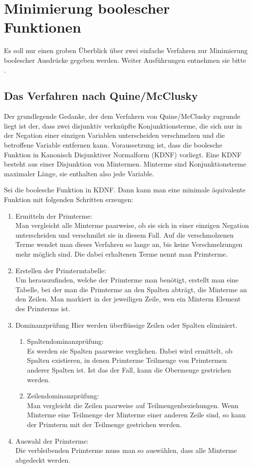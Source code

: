 \documentclass[draft]{scrreprt}
\begin{document}
{	\chapter{Minimierung boolescher Funktionen} \label{Minimierung}
	Es soll nur einen groben Überblick über zwei einfache Verfahren zur Minimierung boolescher Ausdrücke gegeben werden. Weiter Ausführungen entnehmen sie bitte \cite{G01}.
	\section{Das Verfahren nach Quine/McClusky} \label{Min_QMC} 
	Der grundlegende Gedanke, der dem Verfahren von Quine/McClusky zugrunde liegt ist der, dass zwei disjunktiv verknüpfte  Konjunktionsterme, die sich nur in der Negation einer einzigen Variablen unterscheiden verschmelzen und die betroffene Variable entfernen kann. Voraussetzung ist, dass die boolesche Funktion in Kanonisch Disjunktiver Normalform (KDNF) vorliegt. Eine KDNF besteht aus einer Disjunktion von Mintermen. Minterme sind Konjunktionsterme maximaler Länge, sie enthalten also jede Variable.
	
	Sei die boolesche Funktion in KDNF. Dann kann man eine minimale äquivalente Funktion mit folgenden Schritten erzeugen:
	\begin{enumerate}
		\item Ermitteln der Primterme:\\
		Man vergleicht alle Minterme paarweise, ob sie sich in einer einzigen Negation unterscheiden und verschmilzt sie in diesem Fall. Auf die verschmolzenen Terme wendet man dieses Verfahren so lange an, bis keine Verschmelzungen mehr möglich sind. Die dabei erhaltenen Terme nennt man Primterme.
		\item Erstellen der Primtermtabelle:\\
		Um herauszufinden, welche der Primterme man benötigt, erstellt man eine Tabelle, bei der man die Primterme an den Spalten abträgt, die Minterme an den Zeilen. Man markiert in der jeweiligen Zeile, wen ein Minterm Element des Primterms ist.
		\item Dominanzprüfung
		Hier werden überflüssige Zeilen oder Spalten eliminiert. 
		\begin{enumerate}
			\item Spaltendominanzprüfung:\\
			Es werden sie Spalten paarweise verglichen. Dabei wird ermittelt, ob Spalten existieren, in denen Primterme Teilmenge von Primtermen anderer Spalten ist. Ist das der Fall, kann die Obermenge gestrichen werden. 
			\item Zeilendominanzprüfung:\\
			Man vergleicht die Zeilen paarweise auf Teilmengenbeziehungen. Wenn Minterme eine Teilmenge der Minterme einer anderen Zeile sind, so kann der Primterm mit der Teilmenge gestrichen werden. 
		\end{enumerate}
		\item Auswahl der Primterme:\\
		Die verbleibenden Primterme muss man so auswählen, dass alle Minterme abgedeckt werden. 
	\end{enumerate}
}
\end{document}
